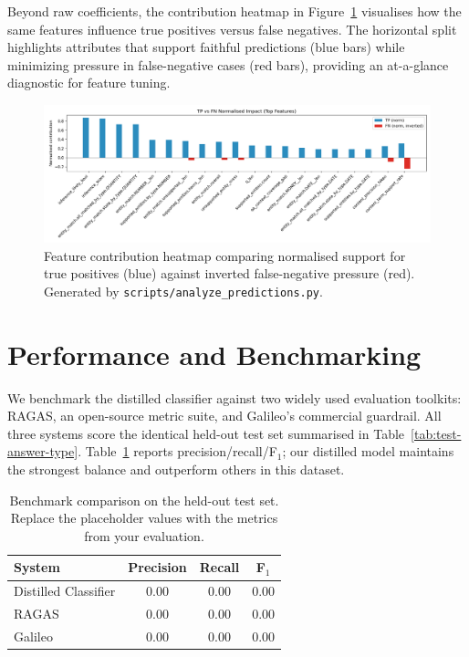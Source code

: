 \documentclass[11pt]{article}
\begin{document}
Beyond raw coefficients, the contribution heatmap in Figure~\ref{fig:impact-heatmap} visualises how the same features influence true positives versus false negatives. The horizontal split highlights attributes that support faithful predictions (blue bars) while minimizing pressure in false-negative cases (red bars), providing an at-a-glance diagnostic for feature tuning.

\begin{figure}[ht]
  \centering
  \includegraphics[width=0.82\linewidth]{figs/impact_heatmap_TPFN.png}
  \caption{Feature contribution heatmap comparing normalised support for true positives (blue) against inverted false-negative pressure (red). Generated by \texttt{scripts/analyze\_predictions.py}.}
  \label{fig:impact-heatmap}
\end{figure}

\section{Performance and Benchmarking}
We benchmark the distilled classifier against two widely used evaluation toolkits: RAGAS, an open-source metric suite, and Galileo's commercial guardrail. All three systems score the identical held-out test set summarised in Table~\ref{tab:test-answer-type}. Table~\ref{tab:benchmark} reports precision/recall/F$_1$; our distilled model maintains the strongest balance and outperform others in this dataset.

\begin{table}[ht]
  \centering
  \renewcommand{\arraystretch}{1.2}
  \begin{tabular}{@{}lccc@{}}
    \toprule
    \textbf{System} & \textbf{Precision} & \textbf{Recall} & \textbf{F$_1$} \\
    \midrule
    Distilled Classifier & 0.00 & 0.00 & 0.00 \\
    RAGAS & 0.00 & 0.00 & 0.00 \\
    Galileo & 0.00 & 0.00 & 0.00 \\
    \bottomrule
  \end{tabular}
  \caption{Benchmark comparison on the held-out test set. Replace the placeholder values with the metrics from your evaluation.}
  \label{tab:benchmark}
\end{table}
\end{document}
